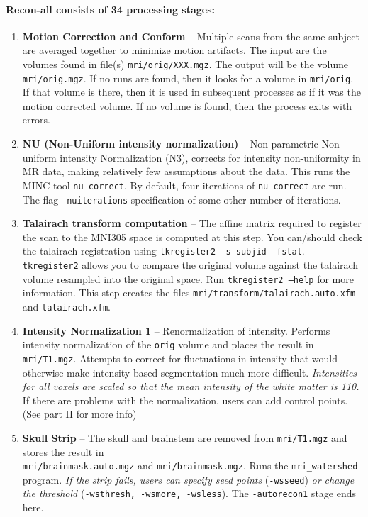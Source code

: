 \documentclass[paper=a4, fontsize=11pt]{scrartcl} %
\numberwithin{equation}{section} %
\numberwithin{figure}{section} %
\numberwithin{table}{section} %
\begin{document}
\paragraph{Recon-all consists of 34 processing stages:}
\begin{enumerate}
    \item  \textbf{Motion Correction and Conform} -- Multiple scans from the same subject are averaged together to minimize motion artifacts.  The input are the volumes found in file(s) \texttt{mri/orig/XXX.mgz}. The output will be the volume \texttt{mri/orig.mgz}. If no runs are found, then it looks for a volume in \texttt{mri/orig}. If that volume is there, then it is used in subsequent processes as if it was the motion corrected volume. If no volume is found, then the process exits with errors.
    
    \item  \textbf{NU (Non-Uniform intensity normalization) }-- Non-parametric Non-uniform intensity Normalization (N3), corrects for intensity non-uniformity in MR data, making relatively few assumptions about the data. This runs the MINC tool \texttt{nu\_correct}. By default, four iterations of \texttt{nu\_correct} are run. The flag \texttt{-nuiterations} specification of some other number of iterations.
    
    \item  \textbf{Talairach transform computation} -- The affine matrix required to register the scan to the MNI305 space is computed at this step.  You can/should check the talairach registration using \texttt{tkregister2 --s subjid --fstal}. \texttt{tkregister2} allows you to compare the original volume against the talairach volume resampled into the original space. Run \texttt{tkregister2 --help} for more information. This step creates the files \texttt{mri/transform/talairach.auto.xfm} and \texttt{talairach.xfm}.
    
    \item  \textbf{Intensity Normalization 1}  -- Renormalization of intensity. Performs intensity normalization of the \texttt{orig} volume and places the result in \texttt{mri/T1.mgz}. Attempts to correct for fluctuations in intensity that would otherwise make intensity-based segmentation much more difficult. \textit{Intensities for all voxels are scaled so that the mean intensity of the white matter is 110.} If there are problems with the normalization, users can add control points. (See part II for more info) 
    
    \item  \textbf{Skull Strip} -- The skull and brainstem are removed from \texttt{mri/T1.mgz} and stores the result in \\ \texttt{mri/brainmask.auto.mgz} and \texttt{mri/brainmask.mgz}. Runs the \texttt{mri\_watershed} program. \textit{If the strip fails, users can specify seed points} (\texttt{-wsseed}) \textit{or change the threshold} (\texttt{-wsthresh, -wsmore, -wsless}). The \texttt{-autorecon1} stage ends here.
    

\end{enumerate}
\end{document}
